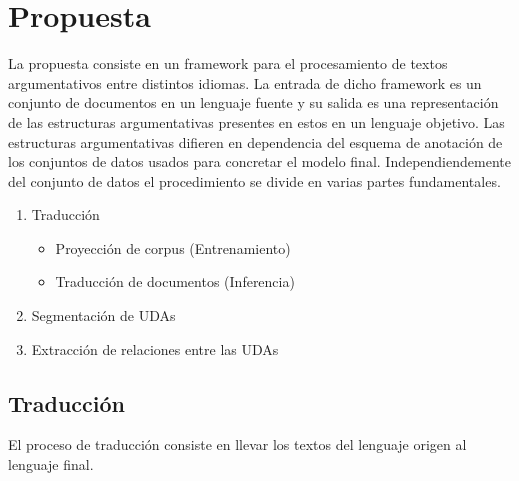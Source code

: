 \chapter{Propuesta}\label{chapter:proposal}





La propuesta consiste en un framework para el procesamiento de textos argumentativos entre distintos idiomas.
La entrada de dicho framework es un conjunto de documentos en un lenguaje fuente y su salida es una representación
de las estructuras argumentativas presentes en estos en un lenguaje objetivo. Las estructuras argumentativas 
difieren en dependencia del esquema de anotación de los conjuntos de datos usados para concretar el modelo
final. Independiendemente del conjunto de datos el procedimiento se divide en varias partes fundamentales.

\begin{enumerate}
    \item Traducción
    \begin{itemize}
        \item Proyección de corpus (Entrenamiento)
        \item Traducción de documentos (Inferencia)
    \end{itemize}
    \item Segmentación de UDAs
    \item Extracción de relaciones entre las UDAs
\end{enumerate}

\section{Traducción}

El proceso de traducción consiste en llevar los textos del lenguaje origen al lenguaje final.

